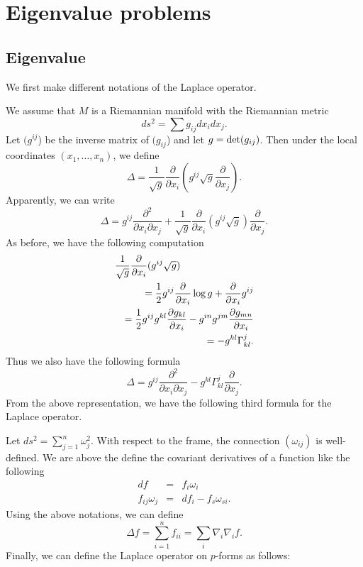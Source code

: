 
\chapter{Eigenvalue problems} 
\section{Eigenvalue}

We first make different notations of the Laplace operator.

We assume that $M$ is a Riemannian manifold with the Riemannian metric 
%
\[ ds^2 = \sum g_{ij} d x _i d x _j .\]
%
Let $ (g^{ij}$) be the inverse matrix of $  (g_{ij}$) and let $ g = {\rm det}  (g_{ij})$. Then under the local coordinates $ (x _1, \ldots, x _n )$, we define
%
\[ \Delta = \frac{1}{\sqrt{g}} \frac{\partial }{\partial x_i} \left( g ^{ij} \sqrt{g} \frac{\partial }{\partial x_j} \right) .\]
%
Apparently, we can write 
%
\[ \Delta =   g^{ij}\frac{\partial^2 }{\partial x_i \partial x _j} +\frac{1}{\sqrt{g} } \frac{\partial }{\partial x_i} \left( g ^{ij} \sqrt{g} \right)\frac{\partial }{\partial x_j}   .  \]
%
As before, we have the following computation 
%
\begin{eqnarray*}
\lefteqn{\frac{1}{\sqrt{g} } \frac{\partial }{\partial x_i}  ( g^{ij} \sqrt{g} )} \\
&& = \frac{1}{2} g^{ij} \frac{\partial}{\partial x_i} \log g + \frac{\partial }{\partial x_i}  g ^{ij} \\
&& = \frac{1}{2} g^{ij}g^{kl}\frac{\partial g _{kl} }{\partial x_i} - g^{in} g^{jm} \frac{\partial g _{mn} }{\partial x_i} \\
&& = - g^{kl} \Gamma ^j _{kl} .
\end{eqnarray*}
Thus we also have the following formula 
%
\[ \Delta = g^{ij}   \frac{\partial^2 }{\partial x_i \partial x _j} - g ^{kl} \Gamma ^j_{kl}  \frac{\partial }{\partial x_j}   .\]
%
From the above representation, we have the following third formula for the Laplace operator.

Let $ ds^2 = \sum^n _{j=1} \omega ^2_j $. With respect to the frame, the connection $ (\omega _{ij} )$ is well-defined. We are above the define the covariant derivatives of a function like the following
%
\begin{eqnarray*}
df & = & f _i \omega _i\\
f_{ij} \omega _j & = & d f _i - f _s \omega _{si}.\end{eqnarray*}
%
Using the above notations, we can define 
%
\[ \Delta f = \sum^n_{i=1} f _{ii} = \sum _i \nabla _i \nabla _i f .\]
%
Finally, we can define the Laplace operator on $p$-forms as follows:

